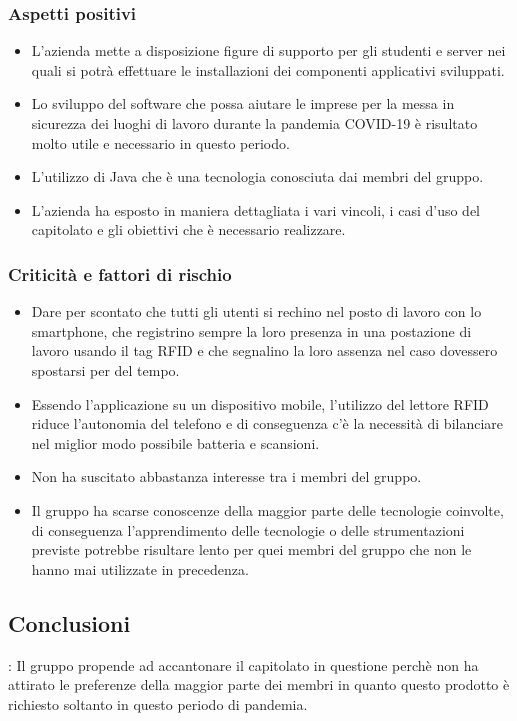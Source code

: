		\subsubsection{Aspetti positivi}
			\begin{itemize}
				\item L’azienda mette a disposizione figure di supporto per gli studenti e server nei quali si potrà effettuare le installazioni dei componenti applicativi sviluppati.
				\item Lo sviluppo del software che possa aiutare le imprese per la messa in sicurezza dei luoghi di lavoro durante la pandemia COVID-19 è risultato molto utile e necessario in questo periodo.
				\item L’utilizzo di Java che è una tecnologia conosciuta dai membri del gruppo.
				\item L’azienda ha esposto in maniera dettagliata i vari vincoli, i casi d’uso del capitolato e gli obiettivi che è necessario realizzare.
			\end{itemize}
			
		\subsubsection{Criticità e fattori di rischio}
			\begin{itemize}
				\item Dare per scontato che tutti gli utenti si rechino nel posto di lavoro con lo smartphone, che registrino sempre la loro presenza in una postazione di lavoro usando il tag RFID e che segnalino la loro assenza nel caso dovessero spostarsi per del tempo.
				\item Essendo l’applicazione su un dispositivo mobile, l’utilizzo del lettore RFID riduce l’autonomia del telefono e di conseguenza c’è la necessità di bilanciare nel miglior modo possibile batteria e scansioni.
				\item Non ha suscitato abbastanza interesse tra i membri del gruppo.
				\item Il gruppo ha scarse conoscenze della maggior parte delle tecnologie coinvolte, di conseguenza l’apprendimento delle tecnologie o delle strumentazioni previste potrebbe risultare lento per quei membri del gruppo che non le hanno mai utilizzate in precedenza. 
			\end{itemize}
		\subsection{Conclusioni}:
			Il gruppo propende ad accantonare il capitolato in questione perchè non ha attirato le preferenze della maggior parte dei membri in quanto questo prodotto è richiesto soltanto in questo periodo di pandemia.

